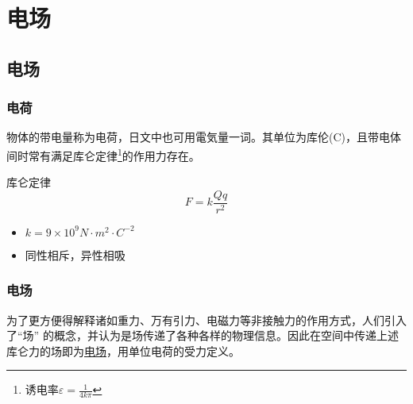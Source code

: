 
\section{电场}

\subsection{电场}
\label{subsec:电场}

\subsubsection{电荷}

物体的带电量称为电荷，日文中也可用電気量一词。其单位为库伦(C)，且带电体间时常有满足库仑定律\footnote{诱电率$\varepsilon=\frac{1}{4k\pi}$}的作用力存在。
\begin{itembox}[l]{库仑定律}
    \begin{equation*}
        F=k\frac{Qq}{r^2}
    \end{equation*}
    \begin{itemize}
        \item $k=9\times10^9N\cdot m^2\cdot C^{-2}$
        \item 同性相斥，异性相吸
    \end{itemize}
\end{itembox}

\subsubsection{电场}

为了更方便得解释诸如重力、万有引力、电磁力等非接触力的作用方式，人们引入了“场” 的概念，并认为是场传递了各种各样的物理信息。因此在空间中传递上述库仑力的场即为\underline{电场}，用单位电荷的受力定义。

